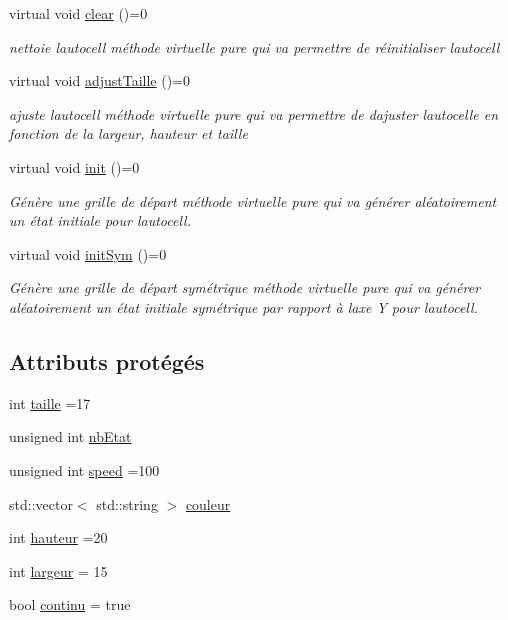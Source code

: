 \begin{DoxyCompactItemize}
virtual void \hyperlink{class_autocell_abffbd1e2026f04e489a03cc9bc0c28f4}{clear} ()=0
\begin{DoxyCompactList}\small\item\em nettoie l\textquotesingle{}autocell méthode virtuelle pure qui va permettre de réinitialiser l\textquotesingle{}autocell \end{DoxyCompactList}\item 
virtual void \hyperlink{class_autocell_a060d956fa55ae3871081b3ecb949689f}{adjust\+Taille} ()=0
\begin{DoxyCompactList}\small\item\em ajuste l\textquotesingle{}autocell méthode virtuelle pure qui va permettre de d\textquotesingle{}ajuster l\textquotesingle{}autocelle en fonction de la largeur, hauteur et taille \end{DoxyCompactList}\item 
virtual void \hyperlink{class_autocell_ac505c956de1d90a48e2d3558bdf97253}{init} ()=0
\begin{DoxyCompactList}\small\item\em Génère une grille de départ méthode virtuelle pure qui va générer aléatoirement un état initiale pour l\textquotesingle{}autocell. \end{DoxyCompactList}\item 
virtual void \hyperlink{class_autocell_aa1e1870af0142596a9a81afe7f300a11}{init\+Sym} ()=0
\begin{DoxyCompactList}\small\item\em Génère une grille de départ symétrique méthode virtuelle pure qui va générer aléatoirement un état initiale symétrique par rapport à l\textquotesingle{}axe Y pour l\textquotesingle{}autocell. \end{DoxyCompactList}\end{DoxyCompactItemize}
\subsection*{Attributs protégés}
\begin{DoxyCompactItemize}
\item 
int \hyperlink{class_autocell_abcfd3af5e49b6a5b4538fb22a5f06d81}{taille} =17
\item 
unsigned int \hyperlink{class_autocell_a35a3592704f2fe987c846017b0fc83b2}{nb\+Etat}
\item 
unsigned int \hyperlink{class_autocell_a52291657adce98a0443559a5cd2e0c0b}{speed} =100
\item 
std\+::vector$<$ std\+::string $>$ \hyperlink{class_autocell_a42cb133bcf58ca2f0e797d938fb79cc5}{couleur}
\item 
int \hyperlink{class_autocell_a30f72e08777d91ecdd047ff5fa9b718f}{hauteur} =20
\item 
int \hyperlink{class_autocell_a7f7e3075befc2cae857ddbb9c4643ab7}{largeur} = 15
\item 
bool \hyperlink{class_autocell_acd28f9a1e0654c9c365923828924b78a}{continu} = true
\end{DoxyCompactItemize}


